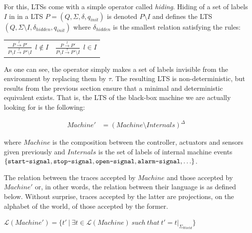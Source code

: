 For this, LTSs come with a simple operator called \emph{hiding}. Hiding of a set of labels $I$ in in a LTS $P = (Q,\Sigma,\delta,q_{init})$ is denoted $P \setminus I$ and defines the LTS $(Q,\Sigma \setminus I,\delta_{hidden},q_{init})$ where $\delta_{hidden}$ is the smallest relation satisfying the rules:

\begin{center}
\begin{tabular}{cc}
$\frac{\displaystyle P \stackrel{l}{\longrightarrow} P'}{\displaystyle P \setminus I \stackrel{l}{\longrightarrow} P' \setminus I}~~l \notin I$ & 
$\frac{\displaystyle P \stackrel{l}{\longrightarrow} P'}{\displaystyle P \setminus I \stackrel{\tau}{\longrightarrow} P' \setminus I}~~l \in I$ \\
\end{tabular}
\end{center}

As one can see, the operator simply makes a set of labels invisible from the environment by replacing them by $\tau$. The resulting LTS is non-deterministic, but results from the previous section ensure that a minimal and deterministic equivalent exists. That is, the LTS of the black-box machine we are actually looking for is the following:

\vspace{-0.8cm}
\begin{align*}
Machine' &= (Machine \setminus Internals)^\Delta
\end{align*}
\vspace{-0.8cm}

\noindent where $Machine$ is the composition between the controller, actuators and sensors given previously and $Internals$ is the set of labels of internal machine events $\{\texttt{start-signal}, \texttt{stop-signal}, \texttt{open-signal}, \texttt{alarm-signal}, \ldots\}$. 

The relation between the traces accepted by $Machine$ and those accepted by $Machine'$ or, in other words, the relation between their language is as defined below. Without surprise, traces accepted by the latter are projections, on the alphabet of the world, of those accepted by the former.

\begin{center}
$\mathcal{L}(Machine') = \{ t'~|~\exists t \in \mathcal{L}(Machine)~such~that~t' = t|_{\Sigma_{World}}\}$
\end{center}

